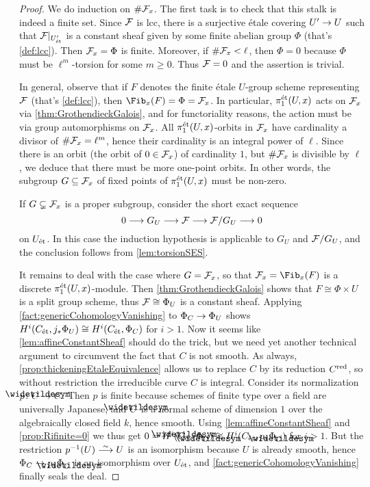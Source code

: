 \begin{proof}
	We do induction on $\# \mathcal{F}_x$. The first task is to check that this stalk is indeed a finite set. Since $\mathcal{F}$ is lcc, there is a surjective étale covering $U'\morphism U$ such that $\mathcal{F}|_{U'_{\mathrm{\acute{e}t}}}$ is a constant sheaf given by some finite abelian group $\Phi$ (that's \cref{def:lcc}). Then $\mathcal{F}_x=\Phi$ is finite. Moreover, if $\#\mathcal{F}_x<\ell$, then $\Phi=0$ because $\Phi$ must be $\ell^m$-torsion for some $m\geq 0$. Thus $\mathcal{F}=0$ and the assertion is trivial.
	
	In general, observe that if $F$ denotes the finite étale $U$-group scheme representing $\mathcal{F}$ (that's \cref{def:lcc}), then $\Fib_x(F)=\Phi= \Ff_x$. In particular, $\pi_1^{\mathrm{\acute{e}t}}(U,x)$ acts on $\mathcal{F}_x$ via \cref{thm:GrothendieckGalois}, and for functoriality reasons, the action must be via group automorphisms on $\mathcal{F}_x$. All $\pi_1^{\mathrm{\acute{e}t}}(U,x)$-orbits in $\mathcal{F}_x$ have cardinality a divisor of $\#\mathcal{F}_x=\ell^m$, hence their cardinality is an integral power of $\ell$. Since there is an orbit (the orbit of $0\in \mathcal{F}_x$) of cardinality $1$, but $\#\mathcal{F}_x$ is divisible by $\ell$, we deduce that there must be more one-point orbits. In other words, the subgroup $G\subseteq \mathcal{F}_x$ of fixed points of $\pi_1^{\mathrm{\acute{e}t}}(U,x)$ must be non-zero.
	
	If $G\subsetneq \mathcal{F}_x$ is a proper subgroup, consider the short exact sequence
	\begin{equation*}
	0\morphism G_U\morphism \Ff\morphism \Ff/G_U\morphism 0
	\end{equation*}
	on $U_{\mathrm{\acute{e}t}}$. In this case the induction hypothesis is applicable to $G_U$ and $\mathcal{F}/G_U$, and the conclusion follows from \cref{lem:torsionSES}.
	
	It remains to deal with the case where $G=\mathcal{F}_x$, so that $\Ff_x=\Fib_x(F)$ is a discrete $\pi_1^{\mathrm{\acute{e}t}}(U,x)$-module. Then \cref{thm:GrothendieckGalois} shows that $F\cong \Phi\times U$ is a split group scheme, thus $\mathcal{F}\cong \Phi_U$ is a constant sheaf. Applying \cref{fact:genericCohomologyVanishing} to $\Phi_C\morphism \Phi_U$ shows $H^i(C_{\mathrm{\acute{e}t}},j_*\Phi_U)\cong H^i(C_{\mathrm{\acute{e}t}},\Phi_C)$ for $i>1$. Now it seems like \cref{lem:affineConstantSheaf} should do the trick, but we need yet another technical argument to circumvent the fact that $C$ is not smooth. As always, \cref{prop:thickeningEtaleEquivalence} allows us to replace $C$ by its reduction $C^{\mathrm{red}}$, so without restriction the irreducible curve $C$ is integral. Consider its normalization $p\colon \snake{C}\morphism C$. Then $p$ is finite because schemes of finite type over a field are universally Japanese, and $\snake{C}$ is a normal scheme of dimension $1$ over the algebraically closed field $k$, hence smooth. Using \cref{lem:affineConstantSheaf} and \cref{prop:Rifinite=0} we thus get $0=H^i(\snake{C}_\et,\Phi_{\snake{C}})\cong H^i(C_\et,p_*\Phi_{\snake{C}})$ for $i>1$. But the restriction $p^{-1}(U)\isomorphism U$ is an isomorphism because $U$ is already smooth, hence $\Phi_C\morphism p_*\Phi_{\snake{C}}$ is an isomorphism over $U_{\mathrm{\acute{e}t}}$, and \cref{fact:genericCohomologyVanishing} finally seals the deal. 
\end{proof}
